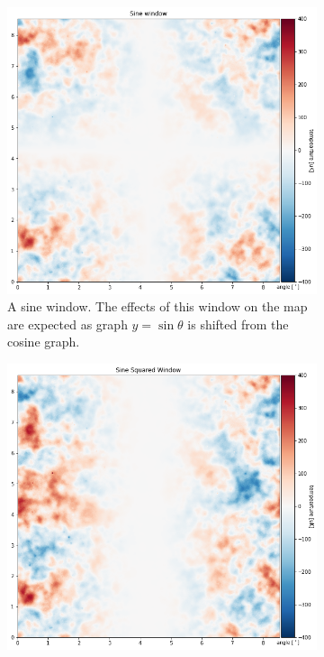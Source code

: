 \documentclass[12pt]{article}
\begin{document}
\begin{figure}[H]
    \centering
    \begin{subfigure}[t]{0.49\textwidth}
        \centering
        \includegraphics[width=\textwidth]{images/sine.png}
        \caption{A sine window. The effects of this window on the map are expected as graph $y=\sin\theta$ is shifted from the cosine graph.}
        \label{fig:sine_window}
    \end{subfigure}
    \hfill
    \begin{subfigure}[t]{0.49\textwidth}
        \centering
        \includegraphics[width=\textwidth]{images/sine squared.png}

\end{subfigure}
\end{figure}
\end{document}
